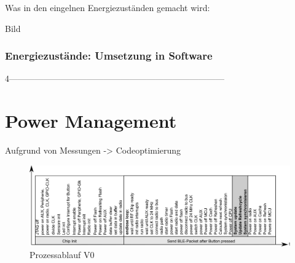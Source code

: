 Was in den eingelnen Energiezuständen gemacht wird:

Bild

\subsubsection*{Energiezustände: Umsetzung in Software}






 4---------------------------------------------------------------------------
\section{Power Management}
\label{powerOptimierung}

Aufgrund von Messungen -> Codeoptimierung






%
%
%
%
%


\begin{figure}
  \includegraphics[width=1.0\textwidth]{../ressources/SimpleLink/V0Sendeablauf.png}
  \caption{Prozessablauf V0}
\end{figure}




